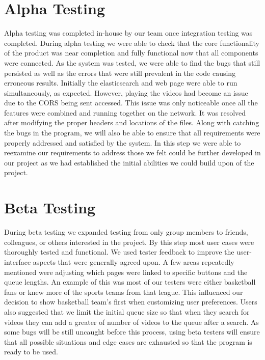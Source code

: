 \section{Alpha Testing}
\par Alpha testing was completed in-house by our team once integration testing was completed. During alpha testing we were able to check that the core functionality of the product was near completion and fully functional now that all components were connected. As the system was tested, we were able to find the bugs that still persisted as well as the errors that were still prevalent in the code causing erroneous results. Initially the elasticsearch and web page were able to run simultaneously, as expected. However, playing the videos had become an issue due to the CORS being sent accessed. This issue was only noticeable once all the features were combined and running together on the network. It was resolved after modifying the proper headers and locations of the files. Along with catching the bugs in the program, we will also be able to ensure that all requirements were properly addressed and satisfied by the system. In this step we were able to reexamine our requirements to address those we felt could be further developed in our project as we had established the initial abilities we could build upon of the project. 

\section{Beta Testing}
\par During beta testing we expanded testing from only group members to friends, colleagues, or others interested in the project. By this step most user cases were thoroughly tested and functional. We used tester feedback to improve the user-interface aspects that were generally agreed upon. A few areas repeatedly mentioned were adjusting which pages were linked to specific buttons and the queue lengths. An example of this was most of our testers were either basketball fans or knew more of the sports teams from that league. This influenced our decision to show basketball team's first when customizing user preferences. Users also suggested that we limit the initial queue size so that when they search for videos they can add a greater of number of videos to the queue after a search.  As some bugs will be still uncaught before this process, using beta testers will ensure that all possible situations and edge cases are exhausted so that the program is ready to be used. 
